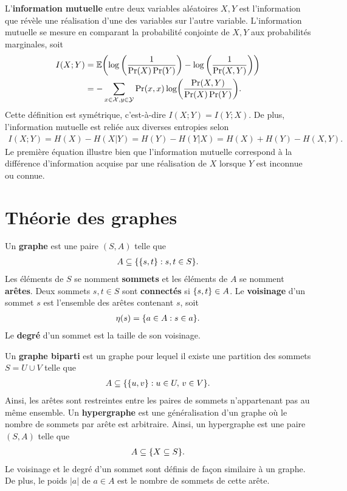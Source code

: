 L'\textbf{information mutuelle} entre deux variables aléatoires $X, Y$ est
l'information que révèle une réalisation d'une des variables sur l'autre variable.
L'information mutuelle se mesure en comparant la probabilité conjointe de $X, Y$
aux probabilités marginales, soit
\begin{align}
  I(X ; Y) 
  &= \mathbb E\qty(
    \log\qty(\frac{1}{\Pr(X)\Pr(Y)})
    -
    \log\qty(\frac{1}{\Pr(X, Y)})
  ) \notag \\
  &= -\sum_{x\in\mathcal X, y \in\mathcal Y}\Pr(x, x) \log(\frac{\Pr(X, Y)}{\Pr(X)\Pr(Y)}).
\end{align}
Cette définition est symétrique,
c'est-à-dire $I(X ; Y) = I(Y ; X)$.
De plus,
l'information mutuelle est reliée aux diverses entropies selon
\begin{align}
  I(X;Y)
  = H(X) - H(X | Y)
  = H(Y) - H(Y | X)
  = H(X) + H(Y) - H(X, Y).
\end{align}
Le première équation illustre bien que l'information mutuelle correspond à la différence
d'information acquise par une réalisation de $X$ lorsque $Y$ est inconnue ou connue.


\chapter{Théorie des graphes}
\label{chap:theo_graphe}

Un \textbf{graphe} est une paire $(S, A)$ telle que 
\begin{align}
  A \subseteq \qty{\qty{s, t} : s,t \in S}.
\end{align}
Les éléments de $S$ se nomment \textbf{sommets}
et les éléments de $A$ se nomment \textbf{arêtes}.
Deux sommets $s, t \in S$ sont \textbf{connectés} si $\qty{s, t} \in A$.
Le \textbf{voisinage} d'un sommet $s$ est l'ensemble des arêtes contenant $s$,
soit 
\begin{align}
  \eta(s) = \qty{a \in A : s \in a}.
\end{align}
Le \textbf{degré} d'un sommet est la taille de son voisinage.

Un \textbf{graphe biparti} est un graphe pour lequel il existe une 
partition des sommets $S = U \cup V$ telle que 
\begin{align}
  A \subseteq \qty{\qty{u, v} : u \in U,\, v \in V}.
\end{align}
Ainsi, les arêtes sont restreintes entre les paires de sommets n'appartenant pas
au même ensemble.
Un \textbf{hypergraphe} est une généralisation d'un graphe
où le nombre de sommets par arête est arbitraire.
Ainsi,
un hypergraphe est une paire $(S, A)$ telle que
\begin{align}
  A \subseteq \qty{X \subseteq S}.
\end{align}
Le voisinage et le degré d'un sommet sont définis de façon similaire à un graphe.
De plus, le poids $|a|$ de $a \in A$ est le nombre de sommets de cette arête.

